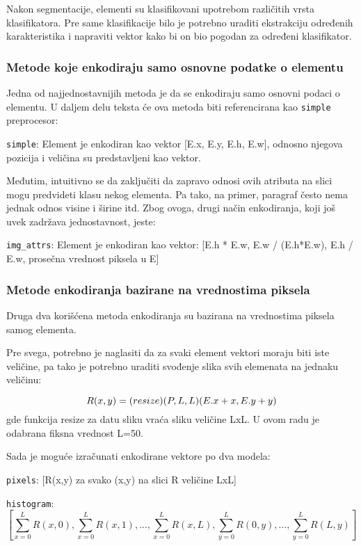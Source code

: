 \documentclass[]{amsart}
\begin{document}
Nakon segmentacije, elementi su klasifikovani upotrebom različitih vrsta klasifikatora. Pre same klasifikacije bilo je potrebno uraditi ekstrakciju
određenih karakteristika i napraviti vektor kako bi on bio pogodan za određeni klasifikator.




\subsubsection{Metode koje enkodiraju samo osnovne podatke o elementu}
\label{sec:orgd93cd26}

Jedna od najjednostavnijih metoda je da se enkodiraju samo osnovni podaci o elementu. U daljem delu teksta će ova metoda biti referencirana kao \texttt{simple} preprocesor:

\texttt{simple}: Element je enkodiran kao vektor [E.x, E.y, E.h, E.w], odnosno njegova pozicija i veličina su predstavljeni kao vektor.


Međutim, intuitivno se da zaključiti da zapravo odnosi ovih atributa na slici mogu predvideti klasu nekog elementa. Pa tako, na primer, paragraf
često nema jednak odnos visine i širine itd. Zbog ovoga, drugi način enkodiranja, koji još uvek zadržava jednostavnost, jeste:

\texttt{img\_attrs}: Element je enkodiran kao vektor:  [E.h * E.w, E.w / (E.h*E.w), E.h / E.w, prosečna vrednost piksela u E]

\newpage 

\subsubsection{Metode enkodiranja bazirane na vrednostima piksela}
\label{sec:org582acb2}

Druga dva korišćena metoda enkodiranja su bazirana na vrednostima piksela samog elementa.

Pre svega, potrebno je naglasiti da za svaki element vektori moraju biti iste veličine, pa tako je potrebno uraditi svođenje slika svih elemenata
na jednaku veličinu:

$$ R(x,y) = \text(resize)(P, L, L)(E.x + x, E.y + y) $$ gde funkcija resize za datu sliku vraća sliku veličine LxL. U ovom radu je odabrana fiksna vrednost L=50.

Sada je moguće izračunati enkodirane vektore po dva modela:

\texttt{pixels}: [R(x,y) za svako (x,y) na slici R veličine LxL]

\texttt{histogram}: $$ [\sum_{x=0}^L R(x, 0), \sum_{x=0}^L R(x, 1), ..., \sum_{x=0}^L R(x, L), \sum_{y=0}^L R(0, y), ...,  \sum_{y=0}^L R(L, y)] $$
\end{document}
